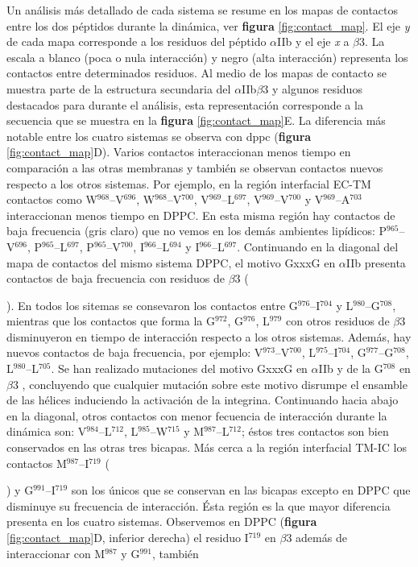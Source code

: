 Un análisis más detallado de cada sistema se resume en los mapas de contactos entre los dos péptidos durante la dinámica, ver \textbf{figura} \ref{fig:contact_map}. El eje \textit{y} de cada mapa corresponde a los residuos del péptido $\alpha$IIb y el eje \textit{x} a $\beta$3. La escala a blanco (poca o nula interacción) y negro (alta interacción) representa los contactos entre determinados residuos. Al medio de los mapas de contacto se muestra parte de la estructura secundaria del $\alpha$IIb$\beta$3 y algunos residuos destacados para durante el análisis, esta representación corresponde a la secuencia que se muestra en la \textbf{figura} \ref{fig:contact_map}E. La diferencia más notable entre los cuatro sistemas se observa con \ac{dppc} (\textbf{figura} \ref{fig:contact_map}D). Varios contactos interaccionan menos tiempo en comparación a las otras membranas y también se observan contactos nuevos respecto a los otros sistemas. Por ejemplo, en la región interfacial EC-TM contactos como W$^{968}$--V$^{696}$, W$^{968}$--V$^{700}$, V$^{969}$--L$^{697}$, V$^{969}$--V$^{700}$ y V$^{969}$--A$^{703}$ interaccionan menos tiempo en DPPC. En esta misma región hay contactos de baja frecuencia (gris claro) que no vemos en los demás ambientes lipídicos: P$^{965}$--V$^{696}$, P$^{965}$--L$^{697}$, P$^{965}$--V$^{700}$, I$^{966}$--L$^{694}$ y I$^{966}$--L$^{697}$. Continuando en la diagonal del mapa de contactos del mismo sistema DPPC, el motivo GxxxG en $\alpha$IIb presenta contactos de baja frecuencia con residuos de $\beta$3 (). En todos los sitemas se consevaron los contactos entre G$^{976}$--I$^{704}$ y L$^{980}$--G$^{708}$, mientras que los contactos que forma la G$^{972}$, G$^{976}$, L$^{979}$ con otros residuos de $\beta$3 disminuyeron en tiempo de interacción respecto a los otros sistemas. Además, hay nuevos contactos de baja frecuencia, por ejemplo: V$^{973}$--V$^{700}$, L$^{975}$--I$^{704}$, G$^{977}$--G$^{708}$, L$^{980}$--L$^{705}$. Se han realizado mutaciones del motivo GxxxG en $\alpha$IIb y de la G$^{708}$ en $\beta$3 \citep{Li2005, Luo2005}, concluyendo que cualquier mutación sobre este motivo disrumpe el ensamble de las hélices induciendo la activación de la integrina. Continuando hacia abajo en la diagonal, otros contactos con menor fecuencia de interacción durante la dinámica son: V$^{984}$--L$^{712}$, L$^{985}$--W$^{715}$ y M$^{987}$--L$^{712}$; éstos tres contactos son bien conservados en las otras tres bicapas. Más cerca a la región interfacial TM-IC los contactos M$^{987}$--I$^{719}$  () y G$^{991}$--I$^{719}$ son los únicos que se conservan en las bicapas excepto en DPPC que disminuye su frecuencia de interacción. Ésta región es la que mayor diferencia presenta en los cuatro sistemas. Observemos en DPPC (\textbf{figura} \ref{fig:contact_map}D, inferior derecha) el residuo I$^{719}$ en $\beta$3 además de interaccionar con M$^{987}$ y G$^{991}$, también 